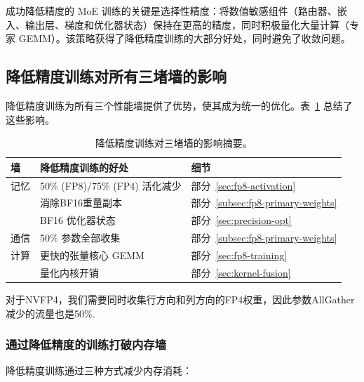 \documentclass[10pt,logo,copyright]{nvidiatechreport_zh}
\begin{document}
\begin{notebox}
成功降低精度的 MoE 训练的关键是选择性精度：将数值敏感组件（路由器、嵌入、输出层、梯度和优化器状态）保持在更高的精度，同时积极量化大量计算（专家 GEMM）。该策略获得了降低精度训练的大部分好处，同时避免了收敛问题。
\end{notebox}

\subsection{降低精度训练对所有三堵墙的影响}

降低精度训练为所有三个性能墙提供了优势，使其成为统一的优化。表~\ref{tab:fp8-impact-summary} 总结了这些影响。

\begin{table}[ht]
\centering
\begin{threeparttable}
\caption{降低精度训练对三堵墙的影响摘要。}
\label{tab:fp8-impact-summary}
\begin{tabular}{lll}
\toprule
\textbf{墙} & \textbf{降低精度训练的好处} & \textbf{细节} \\
\midrule
记忆 & 50\% (FP8)/75\% (FP4) 活化减少 & 部分~\ref{sec:fp8-activation} \\
        & 消除BF16重量副本 & 部分~\ref{subsec:fp8-primary-weights} \\
        & BF16 优化器状态 & 部分~\ref{sec:precision-opt} \\
\midrule
通信 & 50\% 参数全部收集 \tnote{1} & 部分~\ref{subsec:fp8-primary-weights} \\
\midrule
计算 & 更快的张量核心 GEMM & 部分~\ref{sec:fp8-training} \\
        & 量化内核开销 & 部分~\ref{sec:kernel-fusion} \\
\bottomrule
\end{tabular}
\begin{tablenotes}
    \footnotesize
    \item[1] 对于NVFP4，我们需要同时收集行方向和列方向的FP4权重，因此参数AllGather减少的流量也是50\%.
\end{tablenotes}
\end{threeparttable}
\end{table}

\subsubsection{通过降低精度的训练打破内存墙}

降低精度训练通过三种方式减少内存消耗：
\end{document}
